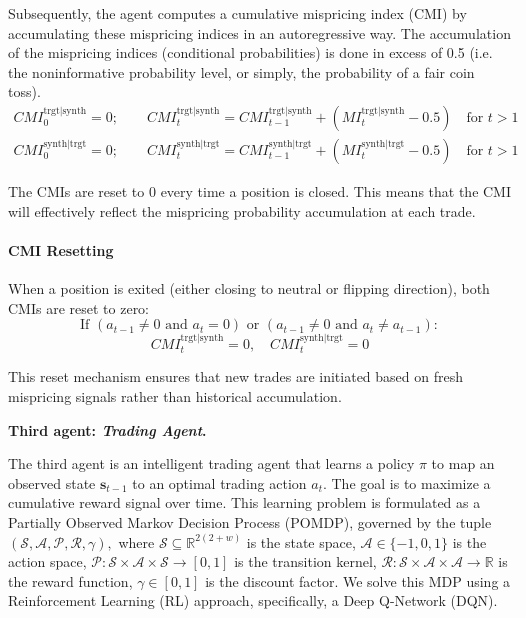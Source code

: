 Subsequently, the agent computes a cumulative mispricing index (CMI) by accumulating these mispricing indices in an autoregressive way.
The accumulation of the mispricing indices (conditional probabilities) is done in excess of 0.5 (i.e. the noninformative probability level, or simply, the probability of a fair coin toss).
$$\begin{array}{llll}
CMI_0^{{\text{trgt}}|{\text{synth}}} =0;
\qquad
CMI_t^{{\text{trgt}}|{\text{synth}}} = CMI_{t-1}^{{\text{trgt}}|{\text{synth}}} + (MI_t^{{\text{trgt}}|{\text{synth}}}  - 0.5)
\quad \text{for~} t>1
\\[0.5em]
CMI_0^{{\text{synth}}|{\text{trgt}}} =0;
\qquad
CMI_t^{{\text{synth}}|{\text{trgt}}} = CMI_{t-1}^{{\text{synth}}|{\text{trgt}}} + (MI_t^{{\text{synth}}|{\text{trgt}}}  - 0.5)
\quad \text{for~} t>1
\end{array}$$

The CMIs are reset to 0 every time a position is closed. This means that the CMI will effectively reflect the mispricing probability accumulation at each trade. 
\paragraph{CMI Resetting}

When a position is exited (either closing to neutral or flipping direction), both CMIs are reset to zero:
$$
\text{If } (a_{t-1} \neq 0 \text{ and } a_t = 0) \text{ or } (a_{t-1} \neq 0 \text{ and } a_t \neq a_{t-1}):$$
$$CMI_t^{\text{trgt}|\text{synth}} = 0, \quad CMI_t^{\text{synth}|\text{trgt}} = 0$$

This reset mechanism ensures that new trades are initiated based on fresh mispricing signals rather than historical accumulation.





\bx 
\textbf{Third agent: \textit{Trading Agent}.} 

The third agent is an intelligent trading agent that learns a policy $\pi$ to map an observed state $\mathbf s_{t-1}$ to an optimal trading action $a_t$. The goal is to maximize a cumulative reward signal over time. This learning problem is formulated as a Partially Observed Markov Decision Process (POMDP), governed by the tuple
$
(\mathcal S, \mathcal A, \mathcal P, \mathcal R, \gamma),
$
where
 $ \mathcal S \subseteq \mathbb{R}^{2(2+w)} $ is the state space,
 $ \mathcal A\in\{-1,0,1\} $ is the action space,
 $ \mathcal P : \mathcal S \times \mathcal A \times \mathcal S \to [0, 1] $ is the transition kernel,
 $ \mathcal R : \mathcal S \times \mathcal A \times \mathcal A \to \mathbb{R} $ is the reward function,
 $ \gamma \in [0, 1] $ is the discount factor.
We solve this MDP using a Reinforcement Learning (RL) approach, specifically, a Deep Q-Network (DQN).

